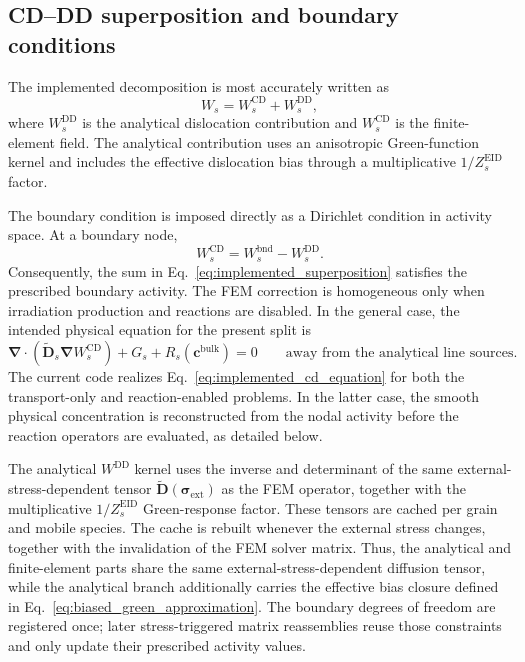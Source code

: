\documentclass[10pt]{article}
\begin{document}
\subsection{CD--DD superposition and boundary conditions}

The implemented decomposition is most accurately written as
\begin{equation}
    W_s
    =
    W_s^{\mathrm{CD}}
    +
    W_s^{\mathrm{DD}},
    \label{eq:implemented_superposition}
\end{equation}
where $W_s^{\mathrm{DD}}$ is the analytical dislocation contribution and
$W_s^{\mathrm{CD}}$ is the finite-element field.  The analytical contribution
uses an anisotropic Green-function kernel and includes the effective
dislocation bias through a multiplicative $1/Z_s^{\mathrm{EID}}$ factor.

The boundary condition is imposed directly as a Dirichlet condition in
activity space.  At a boundary node,
\begin{equation}
    W_{s}^{\mathrm{CD}}
    =
    W_{s}^{\mathrm{bnd}}
    -
    W_{s}^{\mathrm{DD}}.
    \label{eq:implemented_dirichlet_split}
\end{equation}
Consequently, the sum in Eq.~\eqref{eq:implemented_superposition} satisfies
the prescribed boundary activity.  The FEM correction is homogeneous only
when irradiation production and reactions are disabled.  In the general
case, the intended physical equation for the present split is
\begin{equation}
    \boldsymbol{\nabla}\cdot
    \left(
    \widetilde{\boldsymbol{D}}_s
    \boldsymbol{\nabla}W_s^{\mathrm{CD}}
    \right)
    +
    G_s
    +
    R_s(\boldsymbol{c}^{\mathrm{bulk}})
    =
    0
    \qquad
    \text{away from the analytical line sources}.
    \label{eq:implemented_cd_equation}
\end{equation}
The current code realizes Eq.~\eqref{eq:implemented_cd_equation} for both the
transport-only and reaction-enabled problems.  In the latter case, the smooth
physical concentration is reconstructed from the nodal activity before the
reaction operators are evaluated, as detailed below.

The analytical $W^{\mathrm{DD}}$ kernel uses the inverse and determinant of
the same external-stress-dependent tensor
$\widetilde{\boldsymbol{D}}(\boldsymbol{\sigma}_{\mathrm{ext}})$
as the FEM operator, together with the multiplicative
$1/Z_s^{\mathrm{EID}}$ Green-response factor.  These tensors are cached per
grain and mobile species.
The cache is rebuilt whenever the external stress changes, together with the
invalidation of the FEM solver matrix.  Thus, the analytical and
finite-element parts share the same external-stress-dependent diffusion
tensor, while the analytical branch additionally carries the effective bias
closure defined in Eq.~\eqref{eq:biased_green_approximation}.
The boundary degrees of freedom are registered once; later stress-triggered
matrix reassemblies reuse those constraints and only update their prescribed
activity values.
\end{document}
